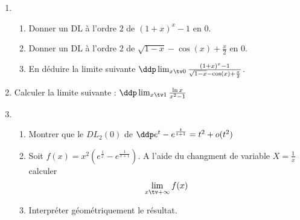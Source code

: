 \documentclass[a4paper, 11pt,reqno]{article}
\begin{document}
\begin{exercice}
\noindent

\begin{enumerate}
\item \begin{enumerate}
\item Donner un DL à l'ordre $2$ de $(1+x)^x-1$ en $0$. 
\item Donner un DL à l'ordre $2$ de $\sqrt{1-x}-\cos(x) +\frac{x}{2}$ en $0$. 
\item En déduire la limite suivante $\ddp \lim_{x\tv 0}   \frac{(1+x)^x-1}{\sqrt{1-x}-\cos(x) +\frac{x}{2}}$.
\end{enumerate}

\item Calculer la limite suivante : $\ddp \lim_{x\tv 1}\frac{\ln{x}}{x^2-1}$
\item 
\begin{enumerate}
\item Montrer que le $DL_2(0) $ de $\ddp e^{t}-e^{\frac{t}{t+1}} = t^2+o(t^2)$
\item Soit $f(x)=  x^2\left( e^{\frac{1}{x}}-e^{\frac{1}{x+1}} \right)$.
A l'aide du changment de variable $X=\frac{1}{x}$ calculer 
$$\lim_{x\tv +\infty} f(x)$$
\item Interpréter géométriquement le résultat. 
\end{enumerate}
\end{enumerate}






\end{exercice}
\end{document}
